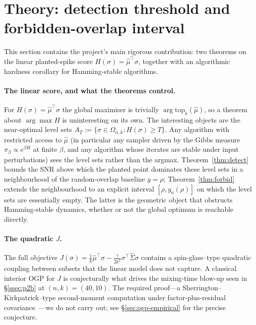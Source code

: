 
\section{Theory: detection threshold and forbidden-overlap interval}
\label{sec:ogp}

This section contains the project's main rigorous contribution: two theorems on the
linear planted-spike score $H(\sigma)=\hat\mu^\top\sigma$, together with an algorithmic
hardness corollary for Hamming-stable algorithms.

\paragraph{The linear score, and what the theorems control.}
For $H(\sigma) = \hat\mu^\top \sigma$ the global maximiser is trivially
$\arg\mathrm{top}_k(\hat\mu)$, so a theorem about $\arg\max H$ is uninteresting on its
own. The interesting objects are the near-optimal level sets
$A_T := \{\sigma \in \Omega_{n,k} : H(\sigma) \ge T\}$. Any algorithm with restricted
access to $\hat\mu$ (in particular any sampler driven by the Gibbs measure
$\pi_\beta \propto e^{\beta H}$ at finite $\beta$, and any algorithm whose iterates are
stable under input perturbations) sees the level sets rather than the argmax.
Theorem~\ref{thm:detect} bounds the SNR above which the planted point dominates these
level sets in a neighbourhood of the random-overlap baseline $y = \rho$;
Theorem~\ref{thm:forbid} extends the neighbourhood to an explicit interval
$[\rho, y_a(\rho)]$ on which the level sets are essentially empty. The latter is the
geometric object that obstructs Hamming-stable dynamics, whether or not the global
optimum is reachable directly.

\paragraph{The quadratic $J$.}
The full objective $J(\sigma) = \tfrac{1}{k}\hat\mu^\top\sigma -
\tfrac{\gamma}{2k^2}\sigma^\top\hat\Sigma\sigma$ contains a spin-glass--type
quadratic coupling between subsets that the linear model does not capture. A classical
interior OGP for $J$ is conjecturally what
drives the mixing-time blow-up seen in \S\ref{ssec:p2b} at $(n,k) = (40,10)$. The
required proof---a Sherrington--Kirkpatrick--type second-moment computation under
factor-plus-residual covariance~\cite{sherrington-kirkpatrick}---we do not carry out;
see \S\ref{sec:ogp-empirical} for the precise conjecture.

